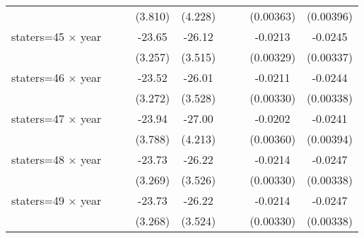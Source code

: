 {\begin{longtable}{l*{8}{c}}
                    &                     &                     &     (3.810)         &     (4.228)         &                     &                     &   (0.00363)         &   (0.00396)         \\
[1em]
staters=45 $\times$ year&                     &                     &      -23.65\sym{***}&      -26.12\sym{***}&                     &                     &     -0.0213\sym{***}&     -0.0245\sym{***}\\
                    &                     &                     &     (3.257)         &     (3.515)         &                     &                     &   (0.00329)         &   (0.00337)         \\
[1em]
staters=46 $\times$ year&                     &                     &      -23.52\sym{***}&      -26.01\sym{***}&                     &                     &     -0.0211\sym{***}&     -0.0244\sym{***}\\
                    &                     &                     &     (3.272)         &     (3.528)         &                     &                     &   (0.00330)         &   (0.00338)         \\
[1em]
staters=47 $\times$ year&                     &                     &      -23.94\sym{***}&      -27.00\sym{***}&                     &                     &     -0.0202\sym{***}&     -0.0241\sym{***}\\
                    &                     &                     &     (3.788)         &     (4.213)         &                     &                     &   (0.00360)         &   (0.00394)         \\
[1em]
staters=48 $\times$ year&                     &                     &      -23.73\sym{***}&      -26.22\sym{***}&                     &                     &     -0.0214\sym{***}&     -0.0247\sym{***}\\
                    &                     &                     &     (3.269)         &     (3.526)         &                     &                     &   (0.00330)         &   (0.00338)         \\
[1em]
staters=49 $\times$ year&                     &                     &      -23.73\sym{***}&      -26.22\sym{***}&                     &                     &     -0.0214\sym{***}&     -0.0247\sym{***}\\
                    &                     &                     &     (3.268)         &     (3.524)         &                     &                     &   (0.00330)         &   (0.00338)         \\

\end{longtable}}
